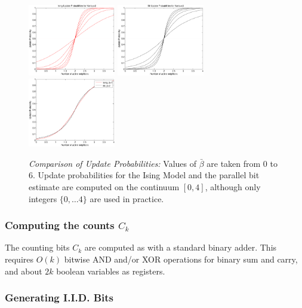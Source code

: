 \begin{figure}
\includegraphics[width=1.5in]{../Speedup/Parallel_Bits/isingup}\quad
\includegraphics[width=1.5in]{../Speedup/Parallel_Bits/bitup}\quad
\includegraphics[width=1.5in]{../Speedup/Parallel_Bits/parcompare}
\caption{\emph{Comparison of Update Probabilities:} 
Values of $\bar\beta$ are taken from 0 to 6.  
Update probabilities for the Ising Model and
the parallel bit estimate are computed on the continuum $[0,4]$, 
although only integers $\{0, \ldots 4\}$ are used in practice.\label{fig: parcompare}}
\end{figure}
\subsubsection{Computing the counts $C_k$}

The counting bits $C_k$ are computed as with a standard binary adder.  
This requires $O(k)$ bitwise AND and/or XOR operations for binary sum and carry,
and about $2k$ boolean variables as registers.

\subsubsection{Generating I.I.D. Bits}


